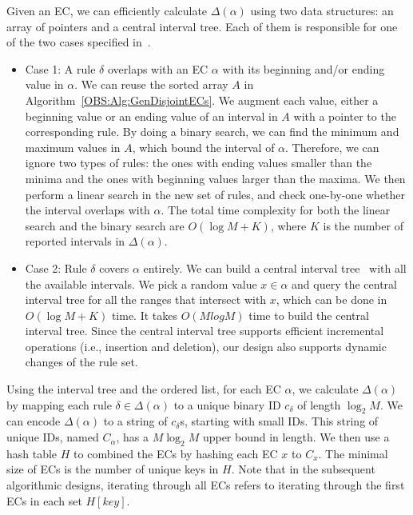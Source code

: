 Given an EC, we can efficiently calculate $\Delta(\alpha)$ using two data structures: an array of pointers and a central interval tree.
Each of them is responsible for one of the two cases specified in~\cite{FindIntersectionWiki}.
\begin{itemize}
\item Case 1: A rule $\delta$ overlaps with an EC $\alpha$ with its beginning and/or ending value in $\alpha$.
        We can reuse the sorted array $A$ in Algorithm~\ref{OBS:Alg:GenDisjointECs}.
        We augment each value, either a beginning value or an ending value of an interval in $A$ with a pointer to the corresponding rule.
        By doing a binary search, we can find the minimum and maximum values in $A$,
        which bound the interval of $\alpha$.
       Therefore, we can ignore two types of rules: the ones with ending values smaller than the minima and the ones with beginning values larger than the maxima.
        We then perform a linear search in the new set of rules, and check one-by-one whether the interval overlaps with $\alpha$.
        The total time complexity for both the linear search and the binary search are $O(\log M + K)$,
        where $K$ is the number of reported intervals in $\Delta(\alpha)$.

\item Case 2: Rule $\delta$ covers $\alpha$ entirely. We can build
        a central interval tree~\cite{ComputationalGeometryBook} with all the available intervals.
        We pick a random value $x \in \alpha$ and query the central interval tree for
        all the ranges that intersect with $x$, which can be done in $O(\log M + K)$ time. It takes $O(M log M)$ time to build the central interval tree.
        Since the central interval tree supports efficient incremental operations (i.e., insertion and deletion), our design also supports dynamic changes of the rule set.
\end{itemize}

Using the interval tree and the ordered list, for each EC $\alpha$,
we calculate $\Delta(\alpha)$ by mapping each rule $\delta \in \Delta(\alpha)$ to a unique binary ID $c_\delta$ of length $\log_2 M$.
We can encode $\Delta(\alpha)$ to a string of $c_\delta$s, starting with small IDs.
This string of unique IDs, named $C_\alpha$, has a $M\log_2 M$ upper bound in length.
We then use a hash table $H$ to combined the ECs by hashing each EC $x$ to $C_x$.
The minimal size of ECs is the number of unique keys in $H$.
Note that in the subsequent algorithmic designs, iterating through all ECs refers to iterating through the first ECs in each set $H[key]$.%

